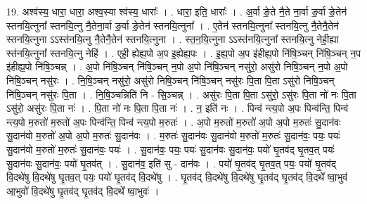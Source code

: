 \documentclass[17pt]{extarticle}
\begin{document}
19. अश्व॑स्य॒ धारा॒ धारा॒ अश्व॒स्या श्व॑स्य॒ धाराः᳚ । . धारा॒ इति॒ धाराः᳚ । . अ॒र्वा ङे॒ते नै॒ते ना॒र्वा ङ॒र्वा ङे॒तेन॑ स्तनयि॒त्नुना᳚ स्तनयि॒त्नु नै॒तेना॒र्वा ङ॒र्वा ङे॒तेन॑ स्तनयि॒त्नुना᳚ । . ए॒तेन॑ स्तनयि॒त्नुना᳚ स्तनयि॒त्नु नै॒तेनै॒तेन॑ स्तनयि॒त्नुना ऽऽस्त॑नयि॒त्नु नै॒तेनै॒तेन॑ स्तनयि॒त्नुना । . स्त॒न॒यि॒त्नुना ऽऽस्त॑नयि॒त्नुना᳚ स्तनयि॒त्नु नेही॒ह्या स्त॑नयि॒त्नुना᳚ स्तनयि॒त्नु नेहि॑ । . एही॒ ह्येह्य॒पो अ॒प इ॒ह्येह्य॒पः । . इ॒ह्य॒पो अ॒प इ॑हीह्य॒पो नि॑षि॒ञ्चन् नि॑षि॒ञ्चन् न॒प इ॑हीह्य॒पो नि॑षि॒ञ्चन्न् । . अ॒पो नि॑षि॒ञ्चन् नि॑षि॒ञ्चन् न॒पो अ॒पो नि॑षि॒ञ्चन् नसु॑रो॒ असु॑रो निषि॒ञ्चन् न॒पो अ॒पो नि॑षि॒ञ्चन् नसु॑रः । . नि॒षि॒ञ्चन् नसु॑रो॒ असु॑रो निषि॒ञ्चन् नि॑षि॒ञ्चन् नसु॑रः पि॒ता पि॒ता ऽसु॑रो निषि॒ञ्चन् नि॑षि॒ञ्चन् नसु॑रः पि॒ता । . नि॒षि॒ञ्चन्निति॑ नि - सि॒ञ्चन्न् । . असु॑रः पि॒ता पि॒ता ऽसु॑रो॒ ऽसु॑रः पि॒ता नो॑ नः पि॒ता ऽसु॑रो॒ असु॑रः पि॒ता नः॑ । . पि॒ता नो॑ नः पि॒ता पि॒ता नः॑ । . न॒ इति॑ नः । . पिन्व॑ न्त्य॒पो अ॒पः पिन्व॑न्ति॒ पिन्व॑ न्त्य॒पो म॒रुतो॑ म॒रुतो॑ अ॒पः पिन्व॑न्ति॒ पिन्व॑ न्त्य॒पो म॒रुतः॑ । . अ॒पो म॒रुतो॑ म॒रुतो॑ अ॒पो अ॒पो म॒रुतः॑ सु॒दान॑वः सु॒दान॑वो म॒रुतो॑ अ॒पो अ॒पो म॒रुतः॑ सु॒दान॑वः । . म॒रुतः॑ सु॒दान॑वः सु॒दान॑वो म॒रुतो॑ म॒रुतः॑ सु॒दान॑वः॒ पयः॒ पयः॑ सु॒दान॑वो म॒रुतो॑ म॒रुतः॑ सु॒दान॑वः॒ पयः॑ । . सु॒दान॑वः॒ पयः॒ पयः॑ सु॒दान॑वः सु॒दान॑वः॒ पयो॑ घृ॒तव॑द् घृ॒तव॒त् पयः॑ सु॒दान॑वः सु॒दान॑वः॒ पयो॑ घृ॒तव॑त् । . सु॒दान॑व॒ इति॑ सु - दान॑वः । . पयो॑ घृ॒तव॑द् घृ॒तव॒त् पयः॒ पयो॑ घृ॒तव॑द् वि॒दथे॑षु वि॒दथे॑षु घृ॒तव॒त् पयः॒ पयो॑ घृ॒तव॑द् वि॒दथे॑षु । . घृ॒तव॑द् वि॒दथे॑षु वि॒दथे॑षु घृ॒तव॑द् घृ॒तव॑द् वि॒दथे᳚ ष्वा॒भुव॑ आ॒भुवो॑ वि॒दथे॑षु घृ॒तव॑द् घृ॒तव॑द् वि॒दथे᳚ ष्वा॒भुवः॑ । \newline
\end{document}
